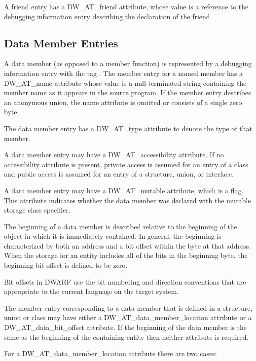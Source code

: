 A friend entry has a DW\_AT\_friend attribute, whose value is
a reference to the debugging information entry describing
the declaration of the friend.


\subsection{Data Member Entries}
\label{chap:datamemberentries}

A data member (as opposed to a member function) is
represented by a debugging information entry with the 
tag . 
The member entry for a named member has
a DW\_AT\_name attribute whose value is a null-terminated
string containing the member name as it appears in the source
program. If the member entry describes an anonymous union, the
name attribute is omitted or consists of a single zero byte.

The data member entry has a DW\_AT\_type attribute to denote
the type of that member.

A data member entry may have a DW\_AT\_accessibility
attribute. If no accessibility attribute is present, private
access is assumed for an entry of a class and public access
is assumed for an entry of a structure, union, or interface.

A data member entry may have a DW\_AT\_mutable attribute,
which is a flag. This attribute indicates whether the data
member was declared with the mutable storage class specifier.

The beginning of a data member is described relative to
the beginning of the object in which it is immediately
contained. In general, the beginning is characterized by
both an address and a bit offset within the byte at that
address. When the storage for an entity includes all of
the bits in the beginning byte, the beginning bit offset is
defined to be zero.

Bit offsets in DWARF use the bit numbering and direction
conventions that are appropriate to the current language on
the target system.

The member entry corresponding to a data member that is
defined in a structure, union or class may have either a
DW\_AT\_data\_member\_location attribute or a DW\_AT\_data\_bit\_offset
attribute. If the beginning of the data member is the same as
the beginning of the containing entity then neither attribute
is required.

For a DW\_AT\_data\_member\_location attribute there are two cases:

